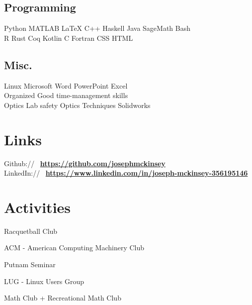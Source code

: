 \documentclass[]{deedy-resume-openfont}
\begin{document}
\begin{minipage}[t]{0.42\textwidth}
\subsection{Programming}
 Python \textbullet{} MATLAB \textbullet{} \LaTeX
\textbullet{} C++ \textbullet{}
Haskell \textbullet{} Java \textbullet{} SageMath \textbullet{} Bash \\
R \textbullet{} Rust \textbullet{} Coq \textbullet{} Kotlin \textbullet{} C
\textbullet{}  Fortran \textbullet{} CSS \textbullet{} HTML \\
\sectionsep

\subsection{Misc.}
Linux \textbullet{} Microsoft Word \textbullet PowerPoint \textbullet Excel \\
Organized \textbullet{} Good time-management skills \\
Optics Lab safety \textbullet{} Optics Techniques \textbullet{} Solidworks \\
\sectionsep



\section{Links} 
Github:// \, \href{https://github.com/josephmckinsey}{\bf https://github.com/josephmckinsey} \\
LinkedIn:// \, \href{https://www.linkedin.com/in/joseph-mckinsey-356195146/}{\bf https://www.linkedin.com/in/joseph-mckinsey-356195146} \\
\sectionsep

\section{Activities}
\vspace{\topsep} %
\begin{tightemize}
\item Racquetball Club
\item ACM - American Computing Machinery Club
\item Putnam Seminar
\item LUG - Linux Users Group
\item Math Club + Recreational Math Club
\end{tightemize}
\sectionsep

%
%

\end{minipage} 
\end{document}
